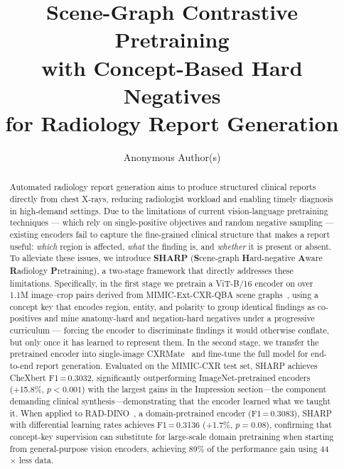 \documentclass[runningheads]{llncs}
\begin{document}
\title{Scene-Graph Contrastive Pretraining\\
       with Concept-Based Hard Negatives\\
       for Radiology Report Generation}

\author{Anonymous Author(s)}

\maketitle

\begin{abstract}
Automated radiology report generation aims to produce structured
clinical reports directly from chest X-rays, reducing radiologist
workload and enabling timely diagnosis in high-demand settings.
Due to the limitations of current vision-language pretraining
techniques --- which rely on single-positive objectives and random
negative sampling --- existing encoders fail to capture the
fine-grained clinical structure that makes a report useful:
\emph{which} region is affected, \emph{what} the finding is, and
\emph{whether} it is present or absent.
To alleviate these issues, we introduce \textbf{SHARP}
(\textbf{S}cene-graph \textbf{H}ard-negative \textbf{A}ware
\textbf{R}adiology \textbf{P}retraining), a two-stage framework that
directly addresses these limitations.
Specifically, in the first stage we pretrain a ViT-B/16 encoder on
over 1.1M image--crop pairs derived from MIMIC-Ext-CXR-QBA scene
graphs~\cite{mimicextcxrqba}, using a concept key that encodes region,
entity, and polarity to group identical findings as co-positives and
mine anatomy-hard and negation-hard negatives under a progressive
curriculum --- forcing the encoder to discriminate findings it would
otherwise conflate, but only once it has learned to represent them.
In the second stage, we transfer the pretrained encoder into
single-image CXRMate~\cite{cxrmate} and fine-tune the full model for
end-to-end report generation.
Evaluated on the MIMIC-CXR test set, SHARP achieves CheXbert
F1\,=\,0.3032, significantly outperforming ImageNet-pretrained encoders
(+15.8\%, $p{<}0.001$) with the largest gains in the Impression
section---the component demanding clinical synthesis---demonstrating
that the encoder learned what we taught it.
When applied to RAD-DINO~\cite{raddino}, a domain-pretrained encoder
(F1\,=\,0.3083), SHARP with differential learning rates achieves
F1\,=\,0.3136 (+1.7\%, $p{=}0.08$), confirming that concept-key
supervision can substitute for large-scale domain pretraining when
starting from general-purpose vision encoders, achieving 89\% of the
performance gain using 44$\times$ less data.
\end{abstract}
\end{document}
